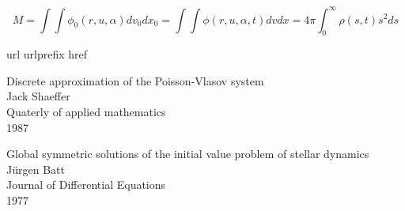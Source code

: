 \documentclass[a4paper,10pt]{scrartcl}
\theoremstyle{definition}
\numberwithin{equation}{section}
\begin{document}
\[ 
    M = \int\int \phi_0(r,u,\alpha) dv_0 dx_0 = \int\int \phi(r,u,\alpha,t) dv dx = 4\pi \int_0^{\infty} \rho(s,t) s^2 ds 
\]



\newpage
\begin{thebibliography}{10}
    \expandafter\ifx\csname url\endcsname\relax
    \def\url#1{\texttt{#1}}\fi
    \expandafter\ifx\csname urlprefix\endcsname\relax\def\urlprefix{URL }\fi
    \expandafter\ifx\csname href\endcsname\relax
    \def\href#1#2{#2} \def\path#1{#1}\fi
    
    Discrete approximation of the Poisson-Vlasov system\\
    Jack Shaeffer\\
    Quaterly of applied mathematics\\
    1987
    
    Global symmetric solutions of the initial value problem of stellar dynamics\\
    Jürgen Batt\\
    Journal of Differential Equations\\
    1977
\end{thebibliography}
	
\end{document}
